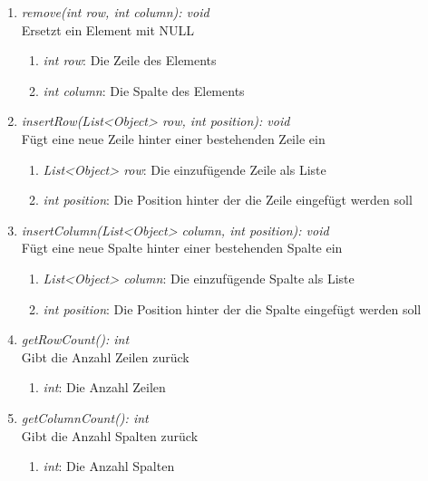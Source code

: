\begin{enumerate}[+]
	\item \textit{remove(int row, int column): void} \\
	Ersetzt ein Element mit NULL
	\begin{enumerate}[$\bullet$]
		\item \textit{int row}: Die Zeile des Elements
		\item \textit{int column}: Die Spalte des Elements
	\end{enumerate}
	\vspace{-0.2cm}
	
	\item \textit{insertRow(List<Object> row, int position): void} \\
	Fügt eine neue Zeile hinter einer bestehenden Zeile ein
	\begin{enumerate}[$\bullet$]
		\item \textit{List<Object> row}: Die einzufügende Zeile als Liste
		\item \textit{int position}: Die Position hinter der die Zeile eingefügt werden soll
	\end{enumerate}
	\vspace{-0.2cm}

	\item \textit{insertColumn(List<Object> column, int position): void} \\
	Fügt eine neue Spalte hinter einer bestehenden Spalte ein
	\begin{enumerate}[$\bullet$]
		\item \textit{List<Object> column}: Die einzufügende Spalte als Liste
		\item \textit{int position}: Die Position hinter der die Spalte eingefügt werden soll
	\end{enumerate}
	\vspace{-0.2cm}

	\item \textit{getRowCount(): int} \\
	Gibt die Anzahl Zeilen zurück
	\vspace{-0.2cm}
	\begin{enumerate}[$\circ$]
		\item \textit{int}: Die Anzahl Zeilen
	\end{enumerate}

	\item \textit{getColumnCount(): int} \\
	Gibt die Anzahl Spalten zurück
	\vspace{-0.2cm}
	\begin{enumerate}[$\circ$]
		\item \textit{int}: Die Anzahl Spalten
	\end{enumerate}


\end{enumerate}
